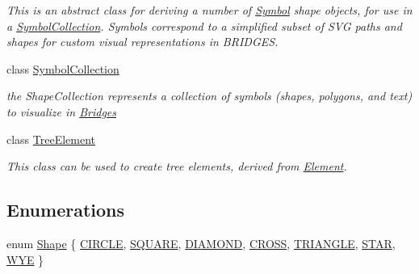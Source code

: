 \begin{DoxyCompactItemize}
\begin{DoxyCompactList}\small\item\em This is an abstract class for deriving a number of \mbox{\hyperlink{classbridges_1_1datastructure_1_1_symbol}{Symbol}} shape objects, for use in a \mbox{\hyperlink{classbridges_1_1datastructure_1_1_symbol_collection}{Symbol\+Collection}}. Symbols correspond to a simplified subset of S\+VG paths and shapes for custom visual representations in B\+R\+I\+D\+G\+ES. \end{DoxyCompactList}\item 
class \mbox{\hyperlink{classbridges_1_1datastructure_1_1_symbol_collection}{Symbol\+Collection}}
\begin{DoxyCompactList}\small\item\em the Shape\+Collection represents a collection of symbols (shapes, polygons, and text) to visualize in \mbox{\hyperlink{classbridges_1_1_bridges}{Bridges}} \end{DoxyCompactList}\item 
class \mbox{\hyperlink{classbridges_1_1datastructure_1_1_tree_element}{Tree\+Element}}
\begin{DoxyCompactList}\small\item\em This class can be used to create tree elements, derived from \mbox{\hyperlink{classbridges_1_1datastructure_1_1_element}{Element}}. \end{DoxyCompactList}\end{DoxyCompactItemize}
\subsection*{Enumerations}
\begin{DoxyCompactItemize}
\item 
enum \mbox{\hyperlink{namespacebridges_1_1datastructure_a3408f5f44d9c6062e5f3adb7e1bbb7f0}{Shape}} \{ \newline
\mbox{\hyperlink{namespacebridges_1_1datastructure_a3408f5f44d9c6062e5f3adb7e1bbb7f0a18ad7c088ebdda05673a1a586eede99a}{C\+I\+R\+C\+LE}}, 
\mbox{\hyperlink{namespacebridges_1_1datastructure_a3408f5f44d9c6062e5f3adb7e1bbb7f0a63cd254f1ceccbe871f60e3b7f0666d5}{S\+Q\+U\+A\+RE}}, 
\mbox{\hyperlink{namespacebridges_1_1datastructure_a3408f5f44d9c6062e5f3adb7e1bbb7f0a170d2d8b57d448ed19e563ee3cd28b35}{D\+I\+A\+M\+O\+ND}}, 
\mbox{\hyperlink{namespacebridges_1_1datastructure_a3408f5f44d9c6062e5f3adb7e1bbb7f0ab6afc15f9badffaf05a23b3f1ba1081a}{C\+R\+O\+SS}}, 
\newline
\mbox{\hyperlink{namespacebridges_1_1datastructure_a3408f5f44d9c6062e5f3adb7e1bbb7f0ab1bf469052aa5abf241c54f8331b6fc4}{T\+R\+I\+A\+N\+G\+LE}}, 
\mbox{\hyperlink{namespacebridges_1_1datastructure_a3408f5f44d9c6062e5f3adb7e1bbb7f0a995b35f7cf12b5842d94aba9ce5c8b4d}{S\+T\+AR}}, 
\mbox{\hyperlink{namespacebridges_1_1datastructure_a3408f5f44d9c6062e5f3adb7e1bbb7f0aa0494702a25d198f538266dcb8ba52df}{W\+YE}}
 \}
\end{DoxyCompactItemize}

